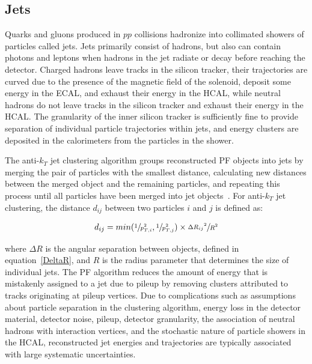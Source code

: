 \subsection{Jets}
\label{PF_Reconstruction_Jets}
Quarks and gluons produced in $pp$ collisions hadronize into collimated showers of particles called jets.
Jets primarily consist of hadrons, but also can contain photons and leptons when hadrons in the jet radiate or decay before reaching the detector.
Charged hadrons leave tracks in the silicon tracker, their trajectories are curved due to the presence of the magnetic field of the solenoid, deposit some energy in the ECAL, and exhaust their energy in the HCAL, while neutral hadrons do not leave tracks in the silicon tracker and exhaust their energy in the HCAL.
The granularity of the inner silicon tracker is sufficiently fine to provide separation of individual particle trajectories within jets, and energy clusters are deposited in the calorimeters from the particles in the shower.

The anti-$k_T$ jet clustering algorithm groups reconstructed PF objects into jets by merging the pair of particles with the smallest distance, calculating new distances between the merged object and the remaining particles, and repeating this process until all particles have been merged into jet objects~\cite{Matteo_Cacciari_2008}.
For anti-$k_T$ jet clustering, the distance $d_{ij}$ between two particles $i$ and $j$ is defined as:
\begin{linenomath*}
\begin{align}
d_{ij} = min(\sfrac{1}{p_{T,i}^2}, \sfrac{1}{p_{T,j}^2}) \times \sfrac{{\Delta R_{ij}}^2}{R^2}
\end{align}
\end{linenomath*}
where $\Delta R$ is the angular separation between objects, defined in equation~\ref{DeltaR}, and $R$ is the radius parameter that determines the size of individual jets.
The PF algorithm reduces the amount of energy that is mistakenly assigned to a jet due to pileup by removing clusters attributed to tracks originating at pileup vertices.
Due to complications such as assumptions about particle separation in the clustering algorithm, energy loss in the detector material, detector noise, pileup, detector granularity, the association of neutral hadrons with interaction vertices, and the stochastic nature of particle showers in the HCAL, reconstructed jet energies and trajectories are typically associated with large systematic uncertainties.


